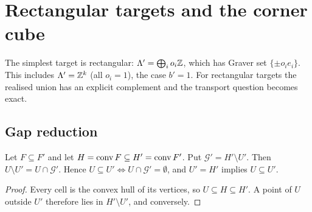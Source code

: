 \section{Rectangular targets and the corner cube}\label{sec:corner}
The simplest target is rectangular: $\Lambda'=\bigoplus_io_i\mathbb Z$, which has Graver set $\{\pm o_ie_i\}$. This includes $\Lambda'=\mathbb Z^k$ (all $o_i=1$), the case $b'=1$. For rectangular targets the realised union has an explicit complement and the transport question becomes exact.

\subsection{Gap reduction}
\begin{lemma}\label{lem:gap}
Let $F\subseteq F'$ and let $H=\operatorname{conv} F\subseteq H'=\operatorname{conv} F'$. Put $\mathcal G'=H'\setminus U'$. Then $U\setminus U'=U\cap\mathcal G'$. Hence $U\subseteq U'\iff U\cap\mathcal G'=\emptyset$, and $U'=H'$ implies $U\subseteq U'$.
\end{lemma}
\begin{proof}
Every cell is the convex hull of its vertices, so $U\subseteq H\subseteq H'$. A point of $U$ outside $U'$ therefore lies in $H'\setminus U'$, and conversely. \qedhere
\end{proof}

